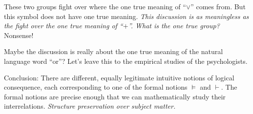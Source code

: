 \documentclass[a4paper]{article}
\begin{document}
These two groups fight over where the one true meaning of ``$\vee$'' comes from.
But this symbol does not have one true meaning.  \emph{This discussion is as
meaningless as the fight over the one true meaning of ``$+$''. What is the one
true group?} Nonsense!

Maybe the discussion is really about the one true meaning of the natural
language word ``or''?  Let's leave this to the empirical studies of the
psychologists.

Conclusion:  There are different, equally legitimate intuitive notions of
logical consequence, each corresponding to one of the formal notions $\models$
and $\vdash$.  The formal notions are precise enough that we can mathematically
study their interrelations.  \emph{Structure preservation over subject matter.}




\end{document}
